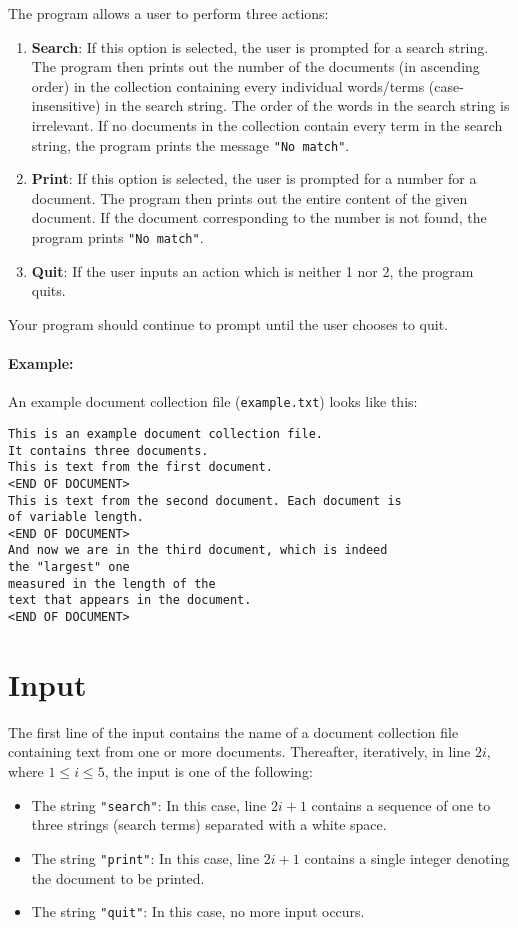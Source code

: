 The program allows a user to perform three actions:
\begin{enumerate}
    \item \textbf{Search}: If this option is selected, the user is prompted for a search string. 
    The program then prints out the number of the documents (in ascending order) in the collection containing every individual words/terms (case-insensitive) in the search string. 
    The order of the words in the search string is irrelevant. 
    If no documents in the collection contain every term in the search string, the program prints the message \texttt{"No match"}.
    \item \textbf{Print}: If this option is selected, the user is prompted for a number for a document. 
    The program then prints out the entire content of the given document. 
    If the document corresponding to the number is not found, the program prints \texttt{"No match"}.
    \item \textbf{Quit}: If the user inputs an action which is neither 1 nor 2, the program quits.
\end{enumerate}

Your program should continue to prompt until the user chooses to quit.

\paragraph{Example:}
An example document collection file (\texttt{example.txt}) looks like this: 

\begin{verbatim}
This is an example document collection file.
It contains three documents.
This is text from the first document.
<END OF DOCUMENT>
This is text from the second document. Each document is 
of variable length.
<END OF DOCUMENT>
And now we are in the third document, which is indeed 
the "largest" one 
measured in the length of the
text that appears in the document.
<END OF DOCUMENT>   
\end{verbatim}


\section*{Input}
The first line of the input contains the name of a document collection file containing text from one or more documents.
Thereafter, iteratively, in line $2i$, where $1 \le i \le 5$, the input is one of the following:
\begin{itemize}
    \item The string \texttt{"search"}: In this case, line $2i + 1$ contains a sequence of one to three strings (search terms) separated with a white space.
    \item The string \texttt{"print"}: In this case, line $2i + 1$ contains a single integer denoting the document to be printed.
    \item The string \texttt{"quit"}: In this case, no more input occurs.
\end{itemize}    


